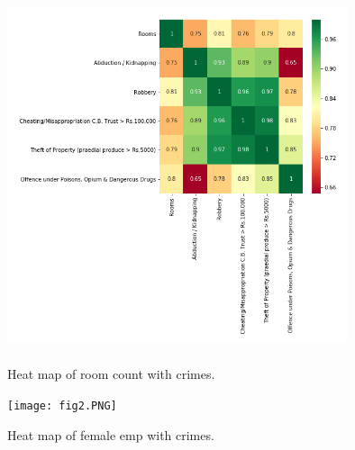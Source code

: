 \documentclass[conference]{IEEEtran}
\begin{document}
\begin{figure}[htbp]
\centerline{\includegraphics[width=10cm,height=11cm]{fig1.PNG}}
\caption{Heat map of room count with crimes.}
\label{fig1}
\end{figure}
\begin{figure}[htbp]
\centerline{\texttt{[image: fig2.PNG]}}
\caption{Heat map of female emp with crimes.}
\label{fig2}
\end{figure}
\end{document}
